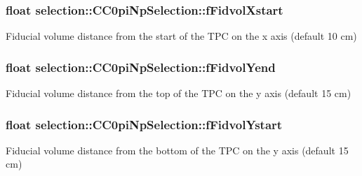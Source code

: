 \subsubsection[{\texorpdfstring{f\+Fidvol\+Xstart}{fFidvolXstart}}]{\setlength{\rightskip}{0pt plus 5cm}float selection\+::\+C\+C0pi\+Np\+Selection\+::f\+Fidvol\+Xstart\hspace{0.3cm}{\ttfamily [private]}}\hypertarget{classselection_1_1CC0piNpSelection_a783e7f9dcd42c083658870f7d23931da}{}\label{classselection_1_1CC0piNpSelection_a783e7f9dcd42c083658870f7d23931da}
Fiducial volume distance from the start of the T\+PC on the x axis (default 10 cm) 
\subsubsection[{\texorpdfstring{f\+Fidvol\+Yend}{fFidvolYend}}]{\setlength{\rightskip}{0pt plus 5cm}float selection\+::\+C\+C0pi\+Np\+Selection\+::f\+Fidvol\+Yend\hspace{0.3cm}{\ttfamily [private]}}\hypertarget{classselection_1_1CC0piNpSelection_a4732dc1091cb1881c741d57f999b5035}{}\label{classselection_1_1CC0piNpSelection_a4732dc1091cb1881c741d57f999b5035}
Fiducial volume distance from the top of the T\+PC on the y axis (default 15 cm) 
\subsubsection[{\texorpdfstring{f\+Fidvol\+Ystart}{fFidvolYstart}}]{\setlength{\rightskip}{0pt plus 5cm}float selection\+::\+C\+C0pi\+Np\+Selection\+::f\+Fidvol\+Ystart\hspace{0.3cm}{\ttfamily [private]}}\hypertarget{classselection_1_1CC0piNpSelection_ac59a66f695af8314018029e4480db16a}{}\label{classselection_1_1CC0piNpSelection_ac59a66f695af8314018029e4480db16a}
Fiducial volume distance from the bottom of the T\+PC on the y axis (default 15 cm) 
